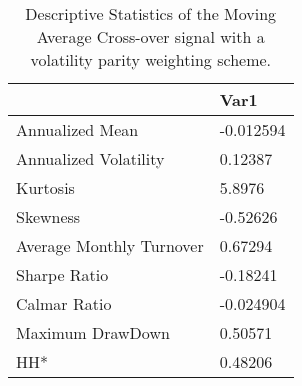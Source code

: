 \begin{table}[H]
\centering
\begin{tabular}{ll}
& Var1 \\ 
\hline 
Annualized Mean & -0.012594 \\ 
Annualized Volatility & 0.12387 \\ 
Kurtosis & 5.8976 \\ 
Skewness & -0.52626 \\ 
Average Monthly Turnover & 0.67294 \\ 
Sharpe Ratio & -0.18241 \\ 
Calmar Ratio & -0.024904 \\ 
Maximum DrawDown & 0.50571 \\ 
HH* & 0.48206 \\ 
\hline
\end{tabular}
\caption{Descriptive Statistics of the Moving Average Cross-over signal with a volatility parity weighting scheme.}
\label{MAVP}
\end{table}